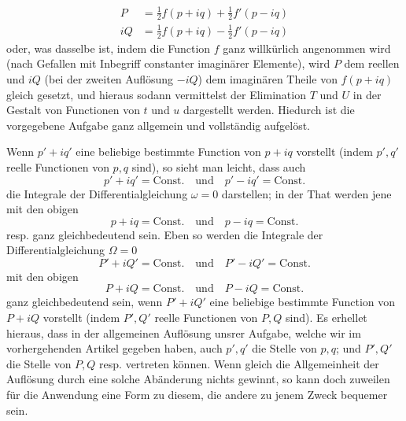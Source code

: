 \[
\begin{aligned}
P&=\tfrac{1}{2}f(p+iq)+\tfrac{1}{2}f'(p-iq)\\
iQ&=\tfrac{1}{2}f(p+iq)-\tfrac{1}{2}f'(p-iq)
\end{aligned}
\]
\noindent oder, was dasselbe ist, indem die Function \(f\) ganz willkürlich angenommen wird (nach Gefallen mit Inbegriff constanter imaginärer Elemente), wird \(P\) dem reellen und \(iQ\) (bei der zweiten Auflösung \(-iQ\)) dem imaginären Theile von \(f(p+iq)\) gleich gesetzt, und hieraus sodann vermittelst der Elimination \(T\) und \(U\) in der Gestalt von Functionen von \(t\) und \(u\) dargestellt werden. Hiedurch ist die vorgegebene Aufgabe ganz allgemein und vollständig aufgelöst.

Wenn \(p'+iq'\) eine beliebige bestimmte Function von \(p+iq\) vorstellt (indem \(p',q'\) reelle Functionen von \(p,q\) sind), so sieht man leicht, dass auch
\[
p'+iq'=\text{Const.}\quad\text{und}\quad p'-iq'=\text{Const.}
\]
\noindent die Integrale der Differentialgleichung \(\omega=0\) darstellen; in der That werden jene mit den obigen
\[
p+iq=\text{Const.}\quad\text{und}\quad p-iq=\text{Const.}
\]
\noindent resp. ganz gleichbedeutend sein. Eben so werden die Integrale der Differentialgleichung \(\Omega=0\)
\[
P'+iQ'=\text{Const.}\quad\text{und}\quad P'-iQ'=\text{Const.}
\]
\noindent mit den obigen
\[
P+iQ=\text{Const.}\quad\text{und}\quad P-iQ=\text{Const.}
\]
\noindent ganz gleichbedeutend sein, wenn \(P'+iQ'\) eine beliebige bestimmte Function von \(P+iQ\) vorstellt (indem \(P',Q'\) reelle Functionen von \(P,Q\) sind). Es erhellet hieraus, dass in der allgemeinen Auflösung unsrer Aufgabe, welche wir im vorhergehenden Artikel gegeben haben, auch \(p',q'\) die Stelle von \(p,q\); und \(P',Q'\) die Stelle von \(P,Q\) resp. vertreten können. Wenn gleich die Allgemeinheit der Auflösung durch eine solche Abänderung nichts gewinnt, so kann doch zuweilen für die Anwendung eine Form zu diesem, die andere zu jenem Zweck bequemer sein.
